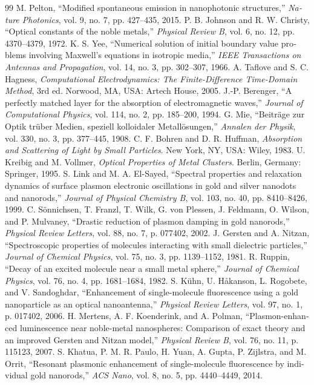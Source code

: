 \documentclass[12pt,a4paper]{report}
\begin{document}
\begin{latin}
\begin{thebibliography}{99}
 M. Pelton, ``Modified spontaneous emission in nanophotonic structures,'' \textit{Nature Photonics}, vol. 9, no. 7, pp. 427--435, 2015.
 P. B. Johnson and R. W. Christy, ``Optical constants of the noble metals,'' \textit{Physical Review B}, vol. 6, no. 12, pp. 4370--4379, 1972.
 K. S. Yee, ``Numerical solution of initial boundary value problems involving Maxwell's equations in isotropic media,'' \textit{IEEE Transactions on Antennas and Propagation}, vol. 14, no. 3, pp. 302--307, 1966.
 A. Taflove and S. C. Hagness, \textit{Computational Electrodynamics: The Finite-Difference Time-Domain Method}, 3rd ed. Norwood, MA, USA: Artech House, 2005.
 J.-P. Berenger, ``A perfectly matched layer for the absorption of electromagnetic waves,'' \textit{Journal of Computational Physics}, vol. 114, no. 2, pp. 185--200, 1994.
 G. Mie, ``Beitr\"age zur Optik tr\"uber Medien, speziell kolloidaler Metall\"osungen,'' \textit{Annalen der Physik}, vol. 330, no. 3, pp. 377--445, 1908.
 C. F. Bohren and D. R. Huffman, \textit{Absorption and Scattering of Light by Small Particles}. New York, NY, USA: Wiley, 1983.
 U. Kreibig and M. Vollmer, \textit{Optical Properties of Metal Clusters}. Berlin, Germany: Springer, 1995.
 S. Link and M. A. El-Sayed, ``Spectral properties and relaxation dynamics of surface plasmon electronic oscillations in gold and silver nanodots and nanorods,'' \textit{Journal of Physical Chemistry B}, vol. 103, no. 40, pp. 8410--8426, 1999.
 C. S\"onnichsen, T. Franzl, T. Wilk, G. von Plessen, J. Feldmann, O. Wilson, and P. Mulvaney, ``Drastic reduction of plasmon damping in gold nanorods,'' \textit{Physical Review Letters}, vol. 88, no. 7, p. 077402, 2002.
 J. Gersten and A. Nitzan, ``Spectroscopic properties of molecules interacting with small dielectric particles,'' \textit{Journal of Chemical Physics}, vol. 75, no. 3, pp. 1139--1152, 1981.
 R. Ruppin, ``Decay of an excited molecule near a small metal sphere,'' \textit{Journal of Chemical Physics}, vol. 76, no. 4, pp. 1681--1684, 1982.
 S. K\"uhn, U. H\aa kanson, L. Rogobete, and V. Sandoghdar, ``Enhancement of single-molecule fluorescence using a gold nanoparticle as an optical nanoantenna,'' \textit{Physical Review Letters}, vol. 97, no. 1, p. 017402, 2006.
 H. Mertens, A. F. Koenderink, and A. Polman, ``Plasmon-enhanced luminescence near noble-metal nanospheres: Comparison of exact theory and an improved Gersten and Nitzan model,'' \textit{Physical Review B}, vol. 76, no. 11, p. 115123, 2007.
 S. Khatua, P. M. R. Paulo, H. Yuan, A. Gupta, P. Zijlstra, and M. Orrit, ``Resonant plasmonic enhancement of single-molecule fluorescence by individual gold nanorods,'' \textit{ACS Nano}, vol. 8, no. 5, pp. 4440--4449, 2014.
\end{thebibliography}
\end{latin}
\end{document}
